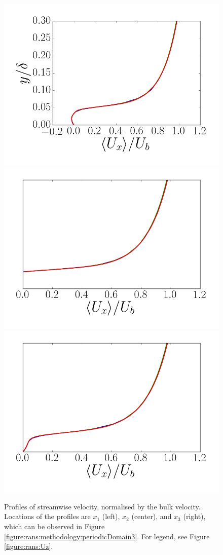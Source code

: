 \documentclass[12pt,oneside,a4paper]{article}
\begin{document}
\begin{figure}
\centering
\includegraphics[width=0.33\linewidth]{images/CFD_meshIndependence/X1_Uz.png}\hfill \includegraphics[width=0.33\linewidth]{images/CFD_meshIndependence/X2_Uz.png}\hfill
\includegraphics[width=0.33\linewidth]{images/CFD_meshIndependence/X3_Uz.png}\hfill
\caption{Profiles of streamwise velocity, normalised by the bulk velocity. Locations of the profiles are $x_1$ (left), $x_2$ (center), and $x_3$ (right), which can be observed in Figure \ref{figure:rans:methodology:periodicDomain3}. For legend, see Figure \ref{figure:rans:Uz}.}
\label{figure:rans:Ux}
\end{figure}
\end{document}

